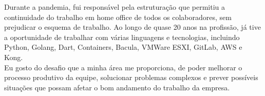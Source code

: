 {{        Durante a pandemia, fui responsável pela estruturação que permitiu a continuidade do trabalho em home office de todos os colaboradores, 
        sem prejudicar o esquema de trabalho. Ao longo de quase 20 anos na profissão, já tive a oportunidade de trabalhar com várias linguagens e tecnologias, 
        incluindo Python, Golang, Dart, Containers, Bacula, VMWare ESXI, GitLab, AWS e Kong.\\
        
        Eu gosto do desafio que a minha área me proporciona, de poder melhorar o processo produtivo da equipe, 
        solucionar problemas complexos e prever possíveis situações que possam afetar o bom andamento do trabalho da empresa.        
    }
}